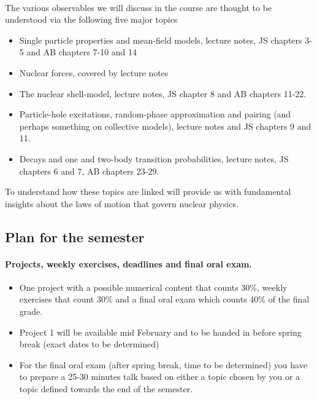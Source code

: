 \documentclass[%
twoside,                 %
final,                   %
10pt]{article}
\begin{document}
\paragraph{}
The various observables we will discuss in the course are thought to be understood via the following five 
major topics
\begin{itemize}
\item Single  particle properties and mean-field models, lecture notes, JS chapters 3-5 and AB chapters 7-10 and 14

\item Nuclear forces, covered by lecture notes

\item The nuclear shell-model, lecture notes, JS chapter 8 and AB chapters 11-22.

\item Particle-hole excitations, random-phase approximation and pairing (and perhaps something on collective models), lecture notes and JS chapters 9 and 11.

\item Decays and one and two-body transition probabilities, lecture notes, JS chapters 6 and 7, AB chapters 23-29.
\end{itemize}

\noindent
To understand how these topics are linked will provide us with fundamental insights about the laws of motion that govern nuclear physics.




\subsection*{Plan for the semester}

\paragraph{Projects, weekly exercises, deadlines and final oral exam.}
\begin{itemize}
\item One  project with a possible numerical content that counts 30\%, weekly exercises  that count 30\% and a final oral exam which counts 40\% of the final grade. 

\item Project 1 will be available mid February and to be handed in before spring break (exact dates to be determined)

\item For the final oral exam (after spring break, time to be determined) you have to prepare a 25-30 minutes talk based on either a topic chosen by you or a topic defined towards the end of the semester.
\end{itemize}
\end{document}
